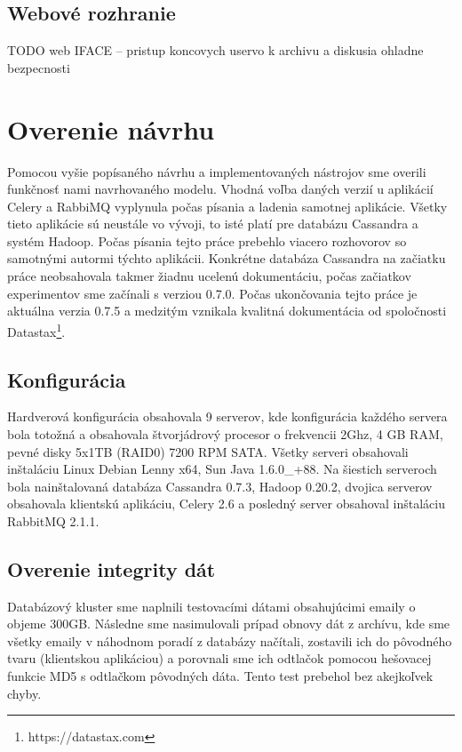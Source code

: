 \documentclass[11pt,twoside,a4paper]{book}
\begin{document}
\subsection{Webové rozhranie}
TODO
web IFACE -- pristup koncovych uservo k archivu a diskusia ohladne bezpecnosti



\section{Overenie návrhu}

Pomocou vyšie popísaného návrhu a implementovaných nástrojov sme overili funkčnosť nami navrhovaného modelu. Vhodná voľba daných verzií u aplikácií Celery a RabbiMQ vyplynula počas písania a ladenia samotnej aplikácie. Všetky tieto aplikácie sú neustále vo vývoji, to isté platí pre databázu Cassandra a systém Hadoop. Počas písania tejto práce prebehlo viacero rozhovorov so samotnými autormi týchto aplikácii. Konkrétne databáza Cassandra na začiatku práce neobsahovala takmer žiadnu ucelenú dokumentáciu, počas začiatkov experimentov sme začínali s verziou 0.7.0. Počas ukončovania tejto práce je aktuálna verzia 0.7.5 a medzitým vznikala kvalitná dokumentácia od spoločnosti Datastax\footnote{https://datastax.com}. 

\subsection*{Konfigurácia}
Hardverová konfigurácia obsahovala 9 serverov, kde konfigurácia každého servera bola totožná a obsahovala štvorjádrový procesor o frekvencii 2Ghz, 4 GB RAM, pevné disky 5x1TB (RAID0) 7200 RPM SATA. Všetky serveri obsahovali inštaláciu Linux Debian Lenny x64, Sun Java 1.6.0\_+88. Na šiestich serveroch bola nainštalovaná databáza Cassandra 0.7.3, Hadoop 0.20.2, dvojica serverov obsahovala klientskú aplikáciu, Celery 2.6 a posledný server obsahoval inštaláciu RabbitMQ 2.1.1. 

\subsection*{Overenie integrity dát}
Databázový kluster sme naplnili testovacími dátami obsahujúcimi emaily o objeme 300GB. Následne sme nasimulovali prípad obnovy dát z archívu, kde sme všetky emaily v náhodnom poradí z databázy načítali, zostavili ich do pôvodného tvaru (klientskou aplikáciou) a porovnali sme ich odtlačok pomocou hešovacej funkcie MD5 s odtlačkom pôvodných dáta. Tento test prebehol bez akejkoľvek chyby. 
\end{document}
